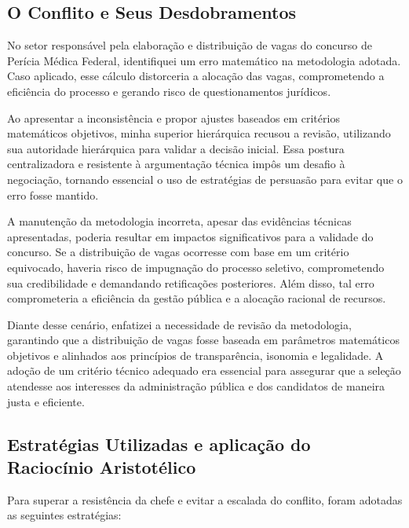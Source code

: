 \documentclass[article,12pt,oneside,a4paper]{article}
\begin{document}
\subsection{O Conflito e Seus Desdobramentos}
\label{sec:org589a516}

No setor responsável pela elaboração e distribuição de vagas do concurso de Perícia Médica Federal, identifiquei um erro matemático na metodologia adotada. Caso aplicado, esse cálculo distorceria a alocação das vagas, comprometendo a eficiência do processo e gerando risco de questionamentos jurídicos.

Ao apresentar a inconsistência e propor ajustes baseados em critérios matemáticos objetivos, minha superior hierárquica recusou a revisão, utilizando sua autoridade hierárquica para validar a decisão inicial. Essa postura centralizadora e resistente à argumentação técnica impôs um desafio à negociação, tornando essencial o uso de estratégias de persuasão para evitar que o erro fosse mantido.

A manutenção da metodologia incorreta, apesar das evidências técnicas apresentadas, poderia resultar em impactos significativos para a validade do concurso. Se a distribuição de vagas ocorresse com base em um critério equivocado, haveria risco de impugnação do processo seletivo, comprometendo sua credibilidade e demandando retificações posteriores. Além disso, tal erro comprometeria a eficiência da gestão pública e a alocação racional de recursos.

Diante desse cenário, enfatizei a necessidade de revisão da metodologia, garantindo que a distribuição de vagas fosse baseada em parâmetros matemáticos objetivos e alinhados aos princípios de transparência, isonomia e legalidade. A adoção de um critério técnico adequado era essencial para assegurar que a seleção atendesse aos interesses da administração pública e dos candidatos de maneira justa e eficiente.
\subsection{Estratégias Utilizadas e aplicação do Raciocínio Aristotélico}
\label{sec:orgf0a26fc}

Para superar a resistência da chefe e evitar a escalada do conflito, foram adotadas as seguintes estratégias:
\end{document}
